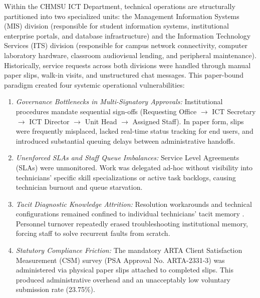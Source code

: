 \documentclass[conference]{IEEEtran}
\begin{document}
Within the CHMSU ICT Department, technical operations are structurally partitioned into two specialized units: the Management Information Systems (MIS) division (responsible for student information systems, institutional enterprise portals, and database infrastructure) and the Information Technology Services (ITS) division (responsible for campus network connectivity, computer laboratory hardware, classroom audiovisual lending, and peripheral maintenance). Historically, service requests across both divisions were handled through manual paper slips, walk-in visits, and unstructured chat messages. This paper-bound paradigm created four systemic operational vulnerabilities:
\begin{enumerate}
    \item \textit{Governance Bottlenecks in Multi-Signatory Approvals:} Institutional procedures mandate sequential sign-offs (Requesting Office $\rightarrow$ ICT Secretary $\rightarrow$ ICT Director $\rightarrow$ Unit Head $\rightarrow$ Assigned Staff). In paper form, slips were frequently misplaced, lacked real-time status tracking for end users, and introduced substantial queuing delays between administrative handoffs.
    \item \textit{Unenforced SLAs and Staff Queue Imbalances:} Service Level Agreements (SLAs) were unmonitored. Work was delegated ad-hoc without visibility into technicians' specific skill specializations or active task backlogs, causing technician burnout and queue starvation.
    \item \textit{Tacit Diagnostic Knowledge Attrition:} Resolution workarounds and technical configurations remained confined to individual technicians' tacit memory \cite{ref13}. Personnel turnover repeatedly erased troubleshooting institutional memory, forcing staff to solve recurrent faults from scratch.
    \item \textit{Statutory Compliance Friction:} The mandatory ARTA Client Satisfaction Measurement (CSM) survey (PSA Approval No. ARTA-2331-3) was administered via physical paper slips attached to completed slips. This produced administrative overhead and an unacceptably low voluntary submission rate (23.75\%).
\end{enumerate}
\end{document}
